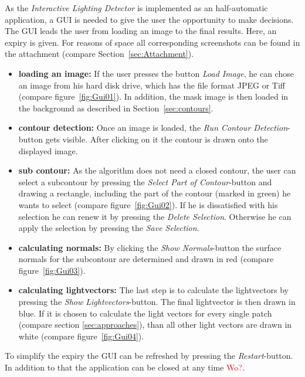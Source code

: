 As the \textit{Interactive Lighting Detector} is implemented as an half-automatic application, a GUI is needed to give the user the opportunity to make decisions. The GUI leads the user from loading an image to the final results. Here, an expiry is given. For reasons of space all corresponding screenshots can be found in the attachment (compare Section~\ref{sec:Attachment}).  
\begin{itemize}
\item \textbf{loading an image:} If the user presses the button \textit{Load Image}, he can chose an image from his hard disk drive, which has the file format JPEG or Tiff (compare figure~\ref{fig:Gui01}). In addition, the mask image is then loaded in the background as described in Section~\ref{sec:contours}.
\item \textbf{contour detection:} Once an image is loaded, the \textit{Run Contour Detection}-button gets visible. After clicking on it the contour is drawn onto the displayed image.
\item \textbf{sub contour:} As the algorithm does not need a closed contour, the user can select a subcontour by pressing the \textit{Select Part of Contour}-button and drawing a rectangle, including the part of the contour (marked in green) he wants to select (compare figure~\ref{fig:Gui02}). If he is dissatisfied with his selection he can renew it by pressing the \textit{Delete Selection}. Otherwise he can apply the selection by pressing the \textit{Save Selection}. 
\item \textbf{calculating normals:} By clicking the \textit{Show Normals}-button the surface normals for the subcontour are determined and drawn in red (compare figure~\ref{fig:Gui03}).
\item \textbf{calculating lightvectors:} The last step is to calculate the lightvectors by pressing the \textit{Show Lightvectors}-button. The final lightvector is then drawn in blue. If it is chosen to calculate the light vectors for every single patch (compare section \ref{sec:approaches}), than all other light vectors are drawn in white (compare figure~\ref{fig:Gui04}). 
\end{itemize}

To simplify the expiry the GUI can be refreshed by pressing the \textit{Restart}-button. In addition to that the application can be closed at any time \textcolor{red}{Wo?}. 


\newpage